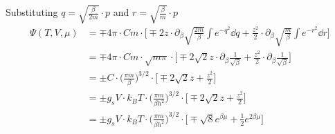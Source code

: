    Substituting $q=\sqrt{\frac{\beta}{2m}}\cdot p$
    and $r=\sqrt{\frac{\beta}{m}}\cdot p$
    \begin{align}
        \Psi(T,V,\mu)
        &=\mp 4\pi\cdot Cm\cdot\bigg[
            \mp2z\cdot\partial_\beta
                \sqrt{\frac{2m}{\beta}}
                \int e^{-q^2} \dd q
            +\frac{z^2}{2}\cdot\partial_\beta
                \sqrt{\frac{m}{\beta}}
                \int e^{-r^2} \dd r
        \bigg] \\
        &=\mp 4\pi\cdot Cm\cdot\sqrt{m\pi}\cdot\bigg[
            \mp2\sqrt{2}z\cdot\partial_\beta
                \frac{1}{\sqrt{\beta}}
            +\frac{z^2}{2}\cdot\partial_\beta
                \frac{1}{\sqrt{\beta}}
        \bigg] \\
            &=\pm C\cdot
            \bigg(\frac{\pi m}{\beta}\bigg)^{3/2}
            \cdot
        \bigg[
            \mp2\sqrt{2}z
            +\frac{z^2}{2}
        \bigg] \\
            &=\pm g_sV\cdot k_BT\cdot
            \bigg(\frac{\pi m}{\beta h^2}\bigg)^{3/2}
            \cdot
        \bigg[
            \mp2\sqrt{2}z
            +\frac{z^2}{2}
        \bigg] \\
            &=\pm g_sV\cdot k_BT\cdot
            \bigg(\frac{\pi m}{\beta h^2}\bigg)^{3/2}
            \cdot
        \bigg[
            \mp\sqrt{8}e^{\beta\mu}
            +\frac{1}{2}e^{2\beta\mu}
        \bigg]
    \end{align}

\newpage
